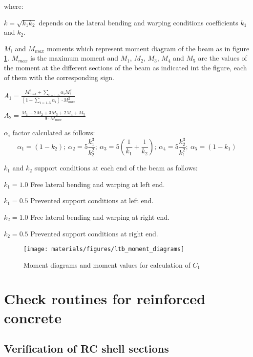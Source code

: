 \noindent where:
\begin{description}
\item{$k= \sqrt{k_1 k_2}$} depends on the lateral bending and warping conditions coefficients $k_1$ and $k_2$.
\item{$M_i$ and $M_{max}$} moments which represent moment diagram of the beam as in figure \ref{fg_moment_diagrams}. $M_{max}$ is the maximum moment and $M_1$, $M_2$, $M_3$, $M_4$ and $M_5$ are the values of the moment at the different sections of the beam as indicated int the figure, each of them with the corresponding sign.
\item{$A_1= \frac{M_{max}^2+\sum\limits_{i= 1..5} \alpha_i M_i^2}{(1+\sum\limits_{i= 1..5} \alpha_i) \cdot M_{max}^2}$}
\item{$A_2= \frac{M_1+2 M_2+ 3 M_3 + 2 M_4 + M_5}{9 \cdot M_{max}}$}
\item{$\alpha_i$} factor calculated as follows:
\begin{equation}
\alpha_1= (1-k_2);\ \alpha_2= 5 \frac{k_1^3}{k_2^2};\ \alpha_3= 5 (\frac{1}{k_1}+\frac{1}{k_2});\ \alpha_4= 5 \frac{k_2^3}{k_1^2};\ \alpha_5= (1-k_1)
\end{equation}
\item{$k_1$ and $k_2$} support conditions at each end of the beam as follows:
\begin{description}
\item{$k_1= 1.0$} Free lateral bending and warping at left end.
\item{$k_1= 0.5$} Prevented support conditions at left end.
\item{$k_2= 1.0$} Free lateral bending and warping at right end.
\item{$k_2= 0.5$} Prevented support conditions at right end.
\end{description}
\end{description}

\begin{figure}
\centering
\texttt{[image: materials/figures/ltb\_moment\_diagrams]}
\caption{Moment diagrams and moment values for calculation of $C_1$}\label{fg_moment_diagrams}
\end{figure}

\section{Check routines for reinforced concrete}
\subsection{Verification of RC shell sections}
